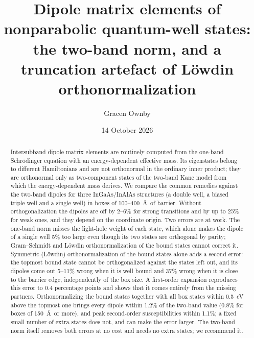 \documentclass[11pt]{article}
\title{Dipole matrix elements of nonparabolic quantum-well states: the two-band norm, and a truncation artefact of L\"owdin orthonormalization}
\author{Gracen Ownby}
\affil{University of Oklahoma, Norman, Oklahoma, USA}
\date{\small 14 October 2026}
\begin{document}
\maketitle

\begin{abstract}
Intersubband dipole matrix elements are routinely computed from the one-band Schr\"odinger equation with an energy-dependent effective mass. Its eigenstates belong to different Hamiltonians and are not orthonormal in the ordinary inner product; they are orthonormal only as two-component states of the two-band Kane model from which the energy-dependent mass derives. We compare the common remedies against the two-band dipoles for three InGaAs/InAlAs structures (a double well, a biased triple well and a single well) in boxes of 100--400~\AA\ of barrier. Without orthogonalization the dipoles are off by 2--6\% for strong transitions and by up to 25\% for weak ones, and they depend on the coordinate origin. Two errors are at work. The one-band norm misses the light-hole weight of each state, which alone makes the dipole of a single well 5\% too large even though its two states are orthogonal by parity; Gram--Schmidt and L\"owdin orthonormalization of the bound states cannot correct it. Symmetric (L\"owdin) orthonormalization of the bound states alone adds a second error: the topmost bound state cannot be orthogonalized against the states left out, and its dipoles come out 5--11\% wrong when it is well bound and 37\% wrong when it is close to the barrier edge, independently of the box size. A first-order expansion reproduces this error to 0.4 percentage points and shows that it comes entirely from the missing partners. Orthonormalizing the bound states together with all box states within 0.5~eV above the topmost one brings every dipole within 1.2\% of the two-band value (0.8\% for boxes of 150~\AA\ or more), and peak second-order susceptibilities within 1.1\%; a fixed small number of extra states does not, and can make the error larger. The two-band norm itself removes both errors at no cost and needs no extra states; we recommend it.
\end{abstract}
\end{document}
